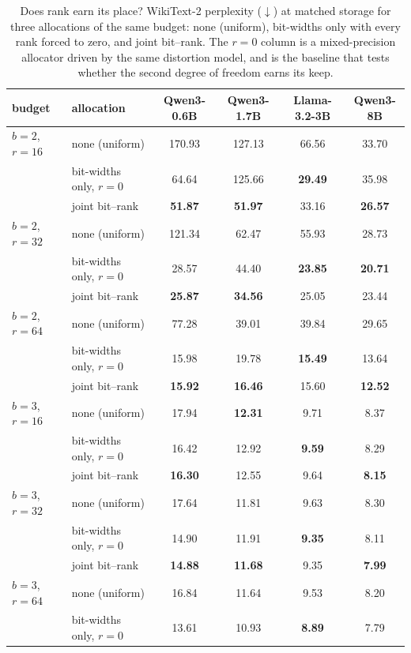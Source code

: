 \begin{table}[H]
\centering
\footnotesize
\setlength{\tabcolsep}{3pt}
\renewcommand{\arraystretch}{0.95}
\caption{Does rank earn its place? WikiText-2 perplexity ($\downarrow$) at matched storage for three allocations of the same budget: none (uniform), bit-widths only with every rank forced to zero, and joint bit--rank. The $r=0$ column is a mixed-precision allocator driven by the same distortion model, and is the baseline that tests whether the second degree of freedom earns its keep.}
\label{tab:r0}
\begin{tabular}{llcccc}
\toprule
budget & allocation & Qwen3-0.6B & Qwen3-1.7B & Llama-3.2-3B & Qwen3-8B \\
\midrule
$b=2$, $r=16$ & none (uniform) & 170.93 & 127.13 & 66.56 & 33.70 \\
 & bit-widths only, $r=0$ & 64.64 & 125.66 & \textbf{29.49} & 35.98 \\
 & joint bit--rank & \textbf{51.87} & \textbf{51.97} & 33.16 & \textbf{26.57} \\
\midrule
$b=2$, $r=32$ & none (uniform) & 121.34 & 62.47 & 55.93 & 28.73 \\
 & bit-widths only, $r=0$ & 28.57 & 44.40 & \textbf{23.85} & \textbf{20.71} \\
 & joint bit--rank & \textbf{25.87} & \textbf{34.56} & 25.05 & 23.44 \\
\midrule
$b=2$, $r=64$ & none (uniform) & 77.28 & 39.01 & 39.84 & 29.65 \\
 & bit-widths only, $r=0$ & 15.98 & 19.78 & \textbf{15.49} & 13.64 \\
 & joint bit--rank & \textbf{15.92} & \textbf{16.46} & 15.60 & \textbf{12.52} \\
\midrule
$b=3$, $r=16$ & none (uniform) & 17.94 & \textbf{12.31} & 9.71 & 8.37 \\
 & bit-widths only, $r=0$ & 16.42 & 12.92 & \textbf{9.59} & 8.29 \\
 & joint bit--rank & \textbf{16.30} & 12.55 & 9.64 & \textbf{8.15} \\
\midrule
$b=3$, $r=32$ & none (uniform) & 17.64 & 11.81 & 9.63 & 8.30 \\
 & bit-widths only, $r=0$ & 14.90 & 11.91 & \textbf{9.35} & 8.11 \\
 & joint bit--rank & \textbf{14.88} & \textbf{11.68} & 9.35 & \textbf{7.99} \\
\midrule
$b=3$, $r=64$ & none (uniform) & 16.84 & 11.64 & 9.53 & 8.20 \\
 & bit-widths only, $r=0$ & 13.61 & 10.93 & \textbf{8.89} & 7.79 \\

\end{tabular}
\end{table}
